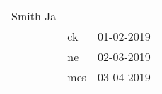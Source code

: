 \documentclass[crop, tikz, dvipsnames]{standalone}
\begin{document}
\sloppy
    \begin{tabular}{lll}
        \colorbox{BurntOrange}{Smith Ja} & & \\
        & ck & 01-02-2019 \\
        & ne & 02-03-2019 \\
        & mes & 03-04-2019 \\
    \end{tabular}
\end{document}

